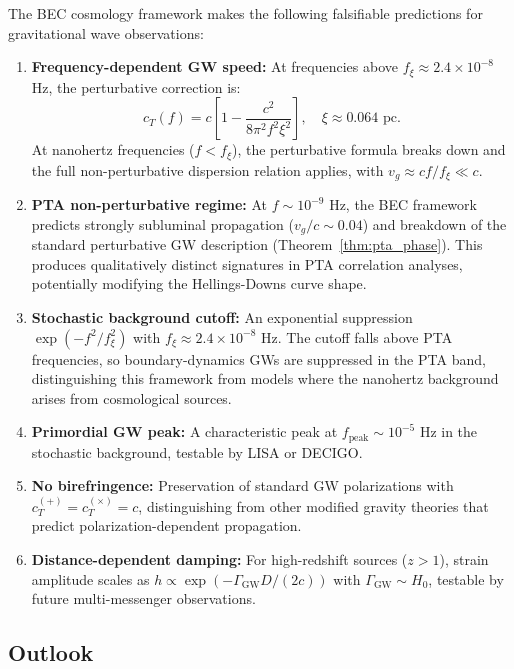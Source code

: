 \documentclass[11pt,a4paper]{article}
\newcommand{\cT}{\ensuremath{c_T}}
\theoremstyle{definition}
\theoremstyle{remark}
\begin{document}
The BEC cosmology framework makes the following falsifiable predictions for gravitational wave observations:

\begin{enumerate}[label=\arabic*.]
\item \textbf{Frequency-dependent GW speed:} At frequencies above $f_\xi \approx 2.4 \times 10^{-8}$ Hz, the perturbative correction is:
\begin{equation}
\cT(f) = c\left[1 - \frac{c^2}{8\pi^2 f^2\xi^2}\right], \quad \xi \approx 0.064 \text{ pc}.
\end{equation}
At nanohertz frequencies ($f < f_\xi$), the perturbative formula breaks down and the full non-perturbative dispersion relation applies, with $v_g \approx cf/f_\xi \ll c$.

\item \textbf{PTA non-perturbative regime:} At $f \sim 10^{-9}$ Hz, the BEC framework predicts strongly subluminal propagation ($v_g/c \sim 0.04$) and breakdown of the standard perturbative GW description (Theorem~\ref{thm:pta_phase}). This produces qualitatively distinct signatures in PTA correlation analyses, potentially modifying the Hellings-Downs curve shape.

\item \textbf{Stochastic background cutoff:} An exponential suppression $\exp(-f^2/f_\xi^2)$ with $f_\xi \approx 2.4 \times 10^{-8}$ Hz. The cutoff falls above PTA frequencies, so boundary-dynamics GWs are suppressed in the PTA band, distinguishing this framework from models where the nanohertz background arises from cosmological sources.

\item \textbf{Primordial GW peak:} A characteristic peak at $f_{\mathrm{peak}} \sim 10^{-5}$ Hz in the stochastic background, testable by LISA or DECIGO.

\item \textbf{No birefringence:} Preservation of standard GW polarizations with $c_T^{(+)} = c_T^{(\times)} = c$, distinguishing from other modified gravity theories that predict polarization-dependent propagation.

\item \textbf{Distance-dependent damping:} For high-redshift sources ($z > 1$), strain amplitude scales as $h \propto \exp(-\Gamma_{\mathrm{GW}}D/(2c))$ with $\Gamma_{\mathrm{GW}} \sim H_0$, testable by future multi-messenger observations.
\end{enumerate}

\subsection{Outlook}
\label{sec:outlook}
\end{document}
